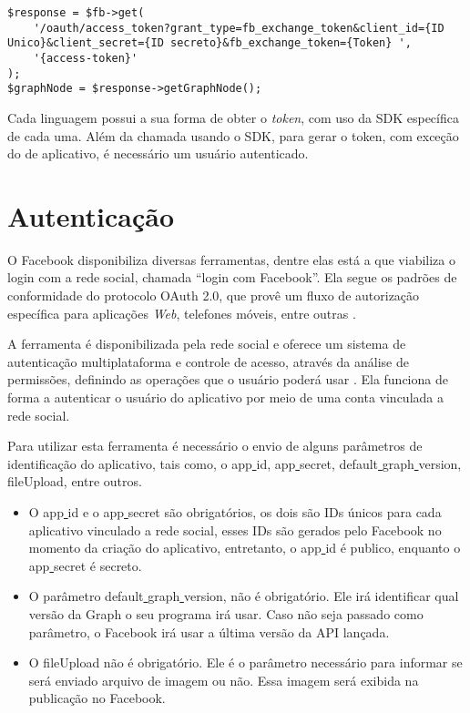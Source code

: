 \begin{lstlisting}[caption={Obtendo Token Infinito},label={lst:tokeninfinito}]
$response = $fb->get(
    '/oauth/access_token?grant_type=fb_exchange_token&client_id={ID Unico}&client_secret={ID secreto}&fb_exchange_token={Token} ',
    '{access-token}'
);
$graphNode = $response->getGraphNode();
\end{lstlisting}

Cada linguagem possui a sua forma de obter o \textit{token}, com uso da SDK específica de cada uma. Além da chamada usando o SDK, para gerar o token, com exceção do de aplicativo, é necessário um usuário autenticado.

\section{Autenticação}
\label{sec:autenticacao}
O Facebook disponibiliza diversas ferramentas, dentre elas está a que viabiliza o login com a rede social, chamada ``login com Facebook''. Ela segue os padrões de conformidade do protocolo OAuth 2.0, que provê um fluxo de autorização específica para aplicações \textit{Web}, telefones móveis, entre outras \cite{oauth2018}. 

A ferramenta é disponibilizada pela rede social e oferece um sistema de autenticação multiplataforma e controle de acesso, através da análise de permissões, definindo as operações que o usuário poderá usar \cite{facebook2018c}. Ela funciona de forma a autenticar o usuário do aplicativo por meio de uma conta vinculada a rede social.

Para utilizar esta ferramenta é necessário o envio de alguns parâmetros de identificação do aplicativo, tais como, o app\underline{{ }}id, app\underline{{ }}secret, default\underline{{ }}graph\underline{{ }}version, fileUpload, entre outros.

\begin{itemize}
\item O app\underline{{ }}id e o app\underline{{ }}secret são obrigatórios, os dois são IDs únicos para cada aplicativo vinculado a rede social, esses IDs são gerados pelo Facebook no momento da criação do aplicativo, entretanto, o app\underline{{ }}id é publico, enquanto o app\underline{{ }}secret é secreto.

\item O parâmetro default\underline{{ }}graph\underline{{ }}version, não é obrigatório. Ele irá identificar qual versão da Graph o seu programa irá usar. Caso não seja passado como parâmetro, o Facebook irá usar a última versão da API lançada.

\item O fileUpload não é obrigatório. Ele é o parâmetro necessário para informar se será enviado arquivo de imagem ou não. Essa imagem será exibida na publicação no Facebook.
\end{itemize}

